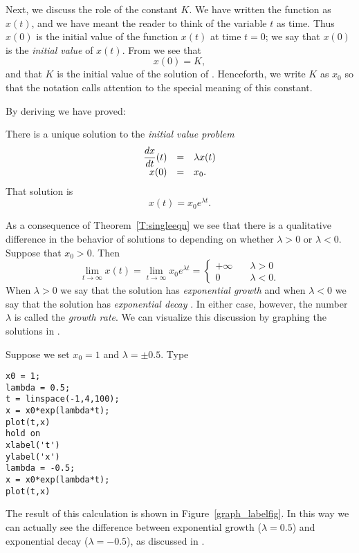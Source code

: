 \documentclass{ximera}
\begin{document}
Next, we discuss the role of the constant $K$.  We have written
the function as $x(t)$, and we have meant the reader to think of
the variable $t$ as time.  Thus $x(0)$ is the initial value of
the function $x(t)$ at time $t=0$; we say that $x(0)$ is the
{\em initial value\/} of $x(t)$.
From  we see that
\[
x(0) = K,
\]
and that $K$ is the initial value of the solution of .
Henceforth, we write $K$ as $x_0$ so that the notation calls
attention to the special meaning of this constant.

By deriving  we have proved:
\begin{theorem}  \label{T:singleeqn}
There is a unique solution to the {\em initial value problem\/}
\arraystart
\begin{equation} \label{ivp1}
\begin{array}{rcl}
\displaystyle \frac{dx}{dt}(t) & = & \lambda x(t) \\
x(0) & = & x_0.
\end{array}
\end{equation}
\arrayfinish
That solution is
\[
x(t) = x_0e^{\lambda t}.
\]
\end{theorem}

As a consequence of Theorem~\ref{T:singleeqn} we see that there
is a qualitative difference in the behavior of solutions to
 depending on whether $\lambda>0$ or $\lambda<0$.
Suppose that $x_0>0$.  Then
\begin{equation}  \label{explimits}
\lim_{t\to\infty} x(t) = \lim_{t\to\infty} x_0e^{\lambda t} =\left\{
\begin{array}{rl} +\infty & \quad\lambda>0 \\ 0 & \quad\lambda<0 . \end{array}
\right.
\end{equation}
When $\lambda>0$ we say that the solution has {\em exponential
growth\/} and when $\lambda< 0$ we say
that the solution has {\em exponential decay\/}
.  In either case, however, the
number $\lambda$ is called the {\em growth rate\/}.  We can visualize this discussion by graphing the
solutions in \Matlabp.

Suppose we set $x_0=1$ and $\lambda=\pm 0.5$.  Type
\begin{verbatim}
x0 = 1;
lambda = 0.5;
t = linspace(-1,4,100);
x = x0*exp(lambda*t);
plot(t,x)
hold on
xlabel('t')
ylabel('x')
lambda = -0.5;
x = x0*exp(lambda*t);
plot(t,x)
\end{verbatim}
The result of this calculation is shown in
Figure~\ref{graph_labelfig}.  In this way we can actually see
the difference between exponential growth ($\lambda=0.5$) and
exponential decay ($\lambda=-0.5$), as discussed in
.
\end{document}

